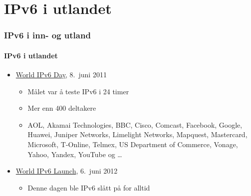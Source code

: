 \section{IPv6 i utlandet}
\begin{frame}%
  \frametitle{IPv6 i inn- og utland}
  \framesubtitle{IPv6 i utlandet}
  \begin{itemize}%
  \item
    \href{http://www.internetsociety.org/ipv6/archive-2011-world-ipv6-day/}{World
      IPv6 Day}, 8.\ juni 2011
    \begin{itemize}%
    \item Målet var å teste IPv6 i 24 timer
    \item Mer enn 400 deltakere
    \item AOL, Akamai Technologies, BBC, Cisco, Comcast, Facebook,
      Google, Huawei, Juniper Networks, Limelight Networks, Mapquest,
      Mastercard, Microsoft, T-Online, Telmex, US Department of
      Commerce, Vonage, Yahoo, Yandex, YouTube og \dots
    \end{itemize}
  \item \href{http://www.worldipv6launch.org/}{World IPv6 Launch},
    6.\ juni 2012
    \begin{itemize}%
    \item Denne dagen ble IPv6 slått på for alltid
    \end{itemize}
  \end{itemize}
\end{frame}

